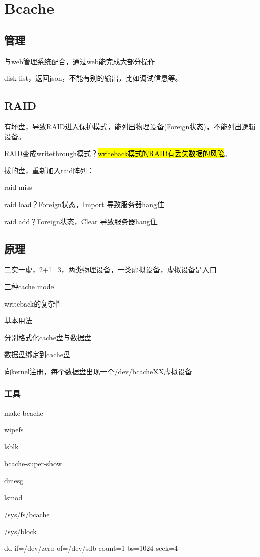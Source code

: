 \chapter{Bcache}

\section{管理}

与web管理系统配合，通过web能完成大部分操作

disk list，返回json，不能有别的输出，比如调试信息等。

\section{RAID}

有坏盘，导致RAID进入保护模式，能列出物理设备(Foreign状态)，不能列出逻辑设备。

RAID变成writethrough模式？\hl{writeback模式的RAID有丢失数据的风险}。

拔的盘，重新加入raid阵列：
\begin{enumbox}
\item raid miss
\item raid load？Foreign状态，Import 导致服务器hang住
\item raid add？Foreign状态，Clear 导致服务器hang住
\end{enumbox}

\section{原理}

二实一虚，2+1=3，两类物理设备，一类虚拟设备，虚拟设备是入口

三种cache mode

writeback的复杂性

基本用法
\begin{enumbox}
\item 分别格式化cache盘与数据盘
\item 数据盘绑定到cache盘
\item 向kernel注册，每个数据盘出现一个/dev/bcacheXX虚拟设备
\end{enumbox}

\subsection{工具}

\begin{enumbox}
\item make-bcache
\item wipefs
\item lsblk
\item bcache-super-show
\item dmesg
\item lsmod
\item /sys/fs/bcache
\item /sys/block
\item dd if=/dev/zero of=/dev/sdb count=1 bs=1024 seek=4
\end{enumbox}

